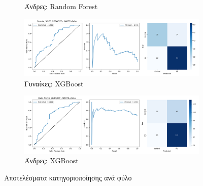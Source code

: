 \documentclass[12pt]{report}
\begin{document}
\begin{figure}[H]
\begin{subfigure}[b]{0.48\textwidth}
                        \caption{Άνδρες: Random Forest}
                        \label{fig:results_stratified_Male_50-70_RF_useSMOTE_False}
                    \end{subfigure}
                    \vspace{0.5cm}
                    \begin{subfigure}[b]{0.48\textwidth}
                        \includegraphics[width=\textwidth]{ML/Predict/DEG/AUC/results_stratified_Female_50-70_XGBOOST_useSMOTE_False.png}
                        \caption{Γυναίκες: XGBoost}
                        \label{fig:results_stratified_Female_50-70_XGBOOST_useSMOTE_False}
                    \end{subfigure}
                    \hfill
                    \begin{subfigure}[b]{0.48\textwidth}
                        \includegraphics[width=\textwidth]{ML/Predict/DEG/AUC/results_stratified_Male_50-70_XGBOOST_useSMOTE_False.png}
                        \caption{Άνδρες: XGBoost}
                        \label{fig:results_stratified_Male_50-70_XGBOOST_useSMOTE_False}
                    \end{subfigure}
                    \vspace{-0.5cm}
                    \caption{Αποτελέσματα κατηγοριοποίησης ανά φύλο}
                    \label{fig:predictions-genders-50-70-all-classifiers}
                \end{figure}
    \newpage
\end{document}
